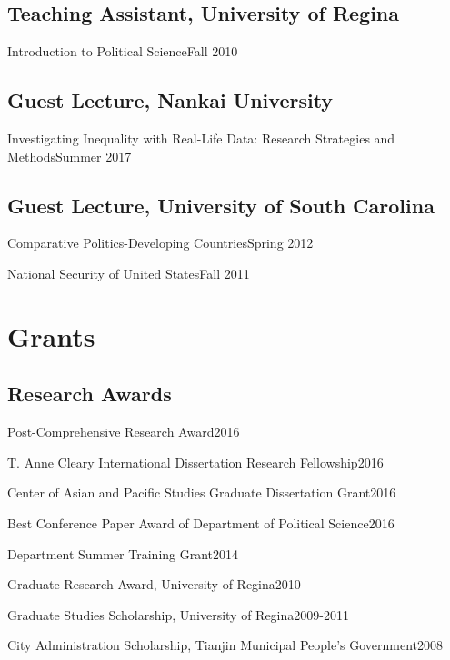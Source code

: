 \documentclass[10.5pt,]{article}
\providecommand{\tightlist}{%
	\setlength{\itemsep}{0pt}\setlength{\parskip}{0pt}}
\renewenvironment{itemize}{
	\begin{list}{}{
			\setlength{\leftmargin}{1.5em}
		}
	}{
	\end{list}
}
\begin{document}
\subsection{Teaching Assistant, University of
Regina}\label{teaching-assistant-university-of-regina}

\begin{itemize}
\tightlist
\item
  Introduction to Political Science\hfill Fall 2010
\end{itemize}

\subsection{Guest Lecture, Nankai
University}\label{guest-lecture-nankai-university}

\begin{itemize}
\tightlist
\item
  Investigating Inequality with Real-Life Data: Research Strategies and
  Methods\hfill Summer 2017
\end{itemize}

\subsection{Guest Lecture, University of South
Carolina}\label{guest-lecture-university-of-south-carolina}

\begin{itemize}
\tightlist
\item
  Comparative Politics-Developing Countries\hfill Spring 2012
\item
  National Security of United States\hfill Fall 2011
\end{itemize}

\section{Grants}\label{grants}

\subsection{Research Awards}\label{research-awards}

\begin{itemize}
\tightlist
\item
  Post-Comprehensive Research Award\hfill 2016
\item
  T. Anne Cleary International Dissertation Research
  Fellowship\hfill 2016
\item
  Center of Asian and Pacific Studies Graduate Dissertation
  Grant\hfill 2016
\item
  Best Conference Paper Award of Department of Political
  Science\hfill 2016
\item
  Department Summer Training Grant\hfill 2014
\item
  Graduate Research Award, University of Regina\hfill 2010
\item
  Graduate Studies Scholarship, University of Regina\hfill 2009-2011
\item
  City Administration Scholarship, Tianjin Municipal People's
  Government\hfill 2008
\end{itemize}
\end{document}
